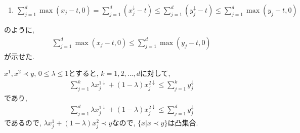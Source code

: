 \begin{ex}
\begin{enumerate}
        \item $ \sum_{j=1}^d \max(x_j - t, 0)
                  =
                  \sum_{j=1}^d (x_j^\downarrow - t)
                  \le
                  \sum_{j=1}^d (y_j^\downarrow - t)
                  \le
                  \sum_{j=1}^d \max(y_j - t,0)$
    \end{enumerate}
    のように,
    \begin{align*}
        \sum_{j=1}^d \max\left( x_j - t, 0\right)
        \le
        \sum_{j=1}^d \max\left( y_j - t, 0\right)
    \end{align*}
    が示せた.
\end{ex}

\begin{ex}
    \label{ex12.18}
    $x^1 , x^2 \prec y$, $ 0 \le \lambda \le 1$とすると,
    $k = 1, 2, ..., d$に対して,
    \begin{align*}
        \sum_{j=1}^k \lambda x_j^{1 \downarrow} + (1-\lambda) x_j^{2 \downarrow}
        \le
        \sum_{j=1}^k y_j^\downarrow
    \end{align*}
    であり,
    \begin{align*}
        \sum_{j=1}^d \lambda x_j^{1 \downarrow} + (1-\lambda) x_j^{2 \downarrow}\le
        \sum_{j=1}^d y_j^\downarrow
    \end{align*}
    であるので, $\lambda x_j^{1} + (1-\lambda) x_j^{2} \prec y$なので, $\{x | x \prec y\}$は凸集合.
\end{ex}

